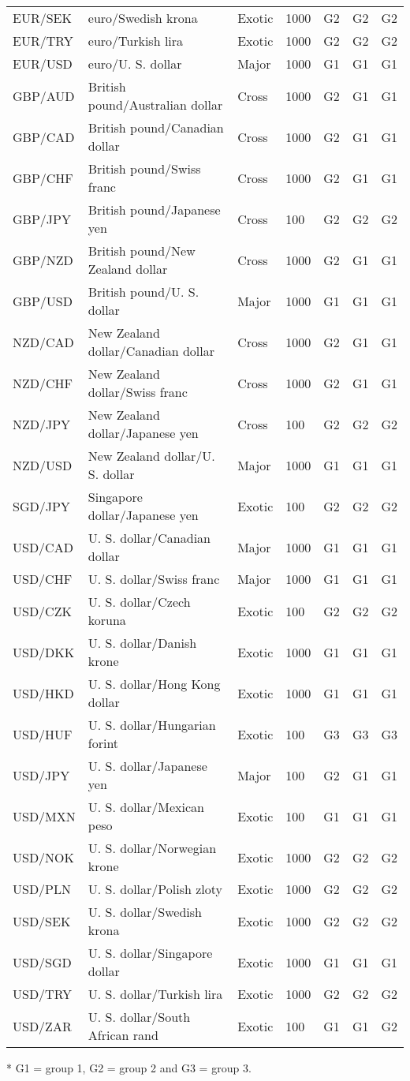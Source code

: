 \begin{table*}
\begin{center}
\begin{centering}
\begin{threeparttable}
\begin{tabular}{lllllll}
    EUR/SEK & euro/Swedish krona & Exotic & 1000 & G2 & G2 & G2\tabularnewline
    EUR/TRY & euro/Turkish lira & Exotic & 1000 & G2 & G2 & G2\tabularnewline
    EUR/USD & euro/U. S. dollar & Major & 1000 & G1 & G1 & G1\tabularnewline
    GBP/AUD & British pound/Australian dollar & Cross & 1000 & G2 & G1 & G1\tabularnewline
    GBP/CAD & British pound/Canadian dollar & Cross & 1000 & G2 & G1 & G1\tabularnewline
    GBP/CHF & British pound/Swiss franc & Cross & 1000 & G2 & G1 & G1\tabularnewline
    GBP/JPY & British pound/Japanese yen & Cross & 100 & G2 & G2 & G2\tabularnewline
    GBP/NZD & British pound/New Zealand dollar & Cross & 1000 & G2 & G1 & G1\tabularnewline
    GBP/USD & British pound/U. S. dollar & Major & 1000 & G1 & G1 & G1\tabularnewline
    NZD/CAD & New Zealand dollar/Canadian dollar & Cross & 1000 & G2 & G1 & G1\tabularnewline
    NZD/CHF & New Zealand dollar/Swiss franc & Cross & 1000 & G2 & G1 & G1\tabularnewline
    NZD/JPY & New Zealand dollar/Japanese yen & Cross & 100 & G2 & G2 & G2\tabularnewline
    NZD/USD & New Zealand dollar/U. S. dollar & Major & 1000 & G1 & G1 & G1\tabularnewline
    SGD/JPY & Singapore dollar/Japanese yen & Exotic & 100 & G2 & G2 & G2\tabularnewline
    USD/CAD & U. S. dollar/Canadian dollar & Major & 1000 & G1 & G1 & G1\tabularnewline
    USD/CHF & U. S. dollar/Swiss franc & Major & 1000 & G1 & G1 & G1\tabularnewline
    USD/CZK & U. S. dollar/Czech koruna & Exotic & 100 & G2 & G2 & G2\tabularnewline
    USD/DKK & U. S. dollar/Danish krone & Exotic & 1000 & G1 & G1 & G1\tabularnewline
    USD/HKD & U. S. dollar/Hong Kong dollar & Exotic & 1000 & G1 & G1 & G1\tabularnewline
    USD/HUF & U. S. dollar/Hungarian forint & Exotic & 100 & G3 & G3 & G3\tabularnewline
    USD/JPY & U. S. dollar/Japanese yen & Major & 100 & G2 & G1 & G1\tabularnewline
    USD/MXN & U. S. dollar/Mexican peso & Exotic & 100 & G1 & G1 & G1\tabularnewline
    USD/NOK & U. S. dollar/Norwegian krone & Exotic & 1000 & G2 & G2 & G2\tabularnewline
    USD/PLN & U. S. dollar/Polish zloty & Exotic & 1000 & G2 & G2 & G2\tabularnewline
    USD/SEK & U. S. dollar/Swedish krona & Exotic & 1000 & G2 & G2 & G2\tabularnewline
    USD/SGD & U. S. dollar/Singapore dollar & Exotic & 1000 & G1 & G1 & G1\tabularnewline
    USD/TRY & U. S. dollar/Turkish lira & Exotic & 1000 & G2 & G2 & G2\tabularnewline
    USD/ZAR & U. S. dollar/South African rand & Exotic & 100 & G1 & G1 & G2\tabularnewline
    \end{tabular}

    \begin{tablenotes}
    \item[*] G1 = group 1, G2 = group 2 and G3 = group 3.
    \end{tablenotes}
    \end{threeparttable}
\end{centering}
\end{center}
\end{table*}

